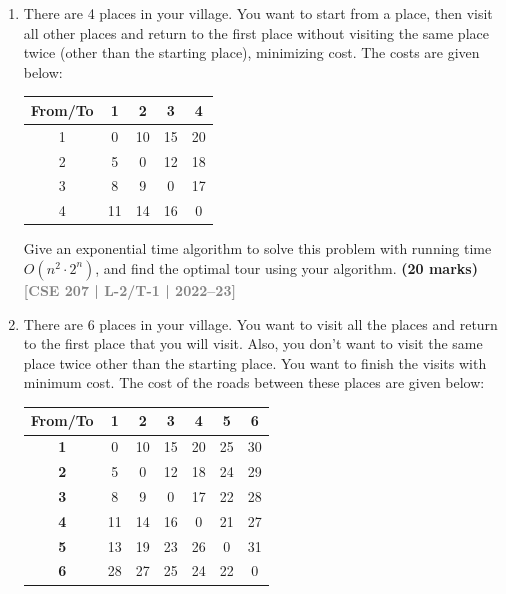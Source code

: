 \documentclass[12pt]{article}
\newcommand{\yr}[1]{\hfill\textcolor{gray}{\small\textbf{[#1]}}}
\newcommand{\mk}[1]{\textcolor{orange!70!black}{\small\textbf{(#1 marks)}}}
\begin{document}
\begin{enumerate}
\item There are 4 places in your village. You want to start from a place, then visit all other places and return to the first place without visiting the same place twice (other than the starting place), minimizing cost. The costs are given below:
\begin{center}
\begin{tabular}{|c|c|c|c|c|}
\hline
\textbf{From/To} & \textbf{1} & \textbf{2} & \textbf{3} & \textbf{4} \\
\hline
1 & 0  & 10 & 15 & 20 \\
2 & 5  & 0  & 12 & 18 \\
3 & 8  & 9  & 0  & 17 \\
4 & 11 & 14 & 16 & 0  \\
\hline
\end{tabular}
\end{center}
Give an exponential time algorithm to solve this problem with running time $O(n^2 \cdot 2^n)$, and find the optimal tour using your algorithm.
\mk{20} \yr{CSE 207 | L-2/T-1 | 2022--23}


\item There are 6 places in your village. You want to visit all the places and return to
the first place that you will visit. Also, you don't want to visit the same place twice
other than the starting place. You want to finish the visits with minimum cost. The
cost of the roads between these places are given below:

\begin{center}
\begin{tabular}{|c|c|c|c|c|c|c|}
\hline
\textbf{From/To} & \textbf{1} & \textbf{2} & \textbf{3} & \textbf{4} & \textbf{5} & \textbf{6} \\ \hline
\textbf{1}       & 0          & 10         & 15         & 20         & 25         & 30         \\ \hline
\textbf{2}       & 5          & 0          & 12         & 18         & 24         & 29         \\ \hline
\textbf{3}       & 8          & 9          & 0          & 17         & 22         & 28         \\ \hline
\textbf{4}       & 11         & 14         & 16         & 0          & 21         & 27         \\ \hline
\textbf{5}       & 13         & 19         & 23         & 26         & 0          & 31         \\ \hline
\textbf{6}       & 28         & 27         & 25         & 24         & 22         & 0          \\ \hline
\end{tabular}
\end{center}


\end{enumerate}
\end{document}
